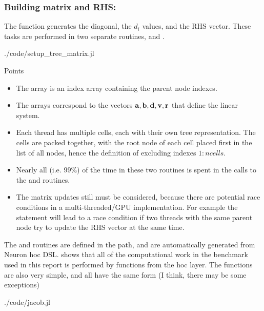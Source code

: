 \subsubsection{Building matrix and RHS: }
The function  generates the diagonal, the $d_i$ values, and the RHS vector. These tasks are performed in two separate routines,  and .
\begin{shaded}
 {./code/setup_tree_matrix.jl}
\end{shaded}

Points
\begin{itemize}
\item
    The array  is an index array containing the parent node indexes.
\item
    The arrays  correspond to the vectors $\mathbf{a}, \mathbf{b}, \mathbf{d}, \mathbf{v}, \mathbf{r}$ that define the linear system.
\item
    Each thread has multiple cells, each with their own tree representation. The cells are packed together, with the root node of each cell placed first in the list of all nodes, hence the definition of  excluding indexes $1:ncells$.
\item
    Nearly all (i.e. 99\%) of the time in these two routines is spent in the calls to the  and  routines.
\item
    The matrix updates still must be considered, because there are potential race conditions in a multi-threaded/GPU implementation. For example the statement  will lead to a race condition if two threads with the same parent node try to update the RHS vector at the same time.
\end{itemize}

The  and  routines are defined in the  path, and are automatically generated from Neuron hoc DSL.  shows that all of the computational work in the \neuron benchmark used in this report is performed by functions from the hoc layer. The  functions are also very simple, and all have the same form (I think, there may be some exceptions)
\begin{shaded}
 {./code/jacob.jl}
\end{shaded}

